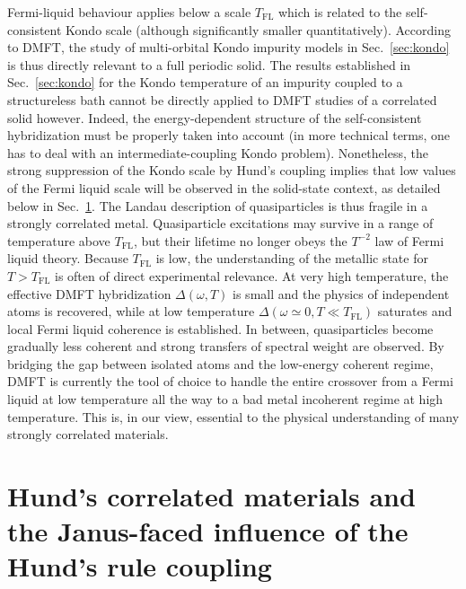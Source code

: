 \documentclass[]{ar2e-changed}%
\def\TFL{T_{\mathrm{FL}}}
\begin{document}
Fermi-liquid behaviour applies below a scale $\TFL$ which is related to the self-consistent Kondo scale (although 
significantly smaller quantitatively). 
%
According to DMFT, the study of multi-orbital Kondo impurity models in Sec.~\ref{sec:kondo} is thus directly relevant to 
a full periodic solid. 
%
The results established in Sec.~\ref{sec:kondo} for the Kondo temperature of an impurity coupled to a structureless bath cannot be 
directly applied to DMFT studies of a correlated solid however.  Indeed, the energy-dependent structure of the self-consistent 
hybridization must be properly taken into account (in more technical terms, one has to deal with an intermediate-coupling 
Kondo problem). 
%
Nonetheless, the strong suppression of the Kondo scale by Hund's coupling implies that low values of the 
Fermi liquid 
scale will be observed in the solid-state context, as detailed below in Sec.~\ref{sec:janus}.
%
The Landau description of quasiparticles is thus fragile in a strongly correlated metal. 
Quasiparticle excitations may survive in a range of temperature above $\TFL$, but their 
lifetime no longer obeys the $T^{-2}$ law of Fermi liquid theory.  
Because $\TFL$ is low, the understanding of the 
metallic state for $T>\TFL$ is often of direct experimental relevance. 
%
At very high temperature, the effective DMFT hybridization $\Delta(\omega,T)$ 
is small and the physics of independent atoms is recovered, while at low temperature $\Delta(\omega\simeq 0,T\ll\TFL)$ saturates 
and local Fermi liquid coherence is established. In between, quasiparticles become gradually less coherent and strong transfers 
of spectral weight are observed.
% 
By bridging the gap between isolated atoms and the low-energy coherent regime, DMFT is currently the tool of choice to handle 
the entire crossover from a Fermi liquid at low temperature all the way to a bad metal incoherent regime at high temperature. 
%
This is, in our view, essential to the physical understanding of  many strongly correlated materials. 


\section{Hund's correlated materials and the Janus-faced influence of the Hund's rule coupling}
\label{sec:janus}
%
\end{document}
